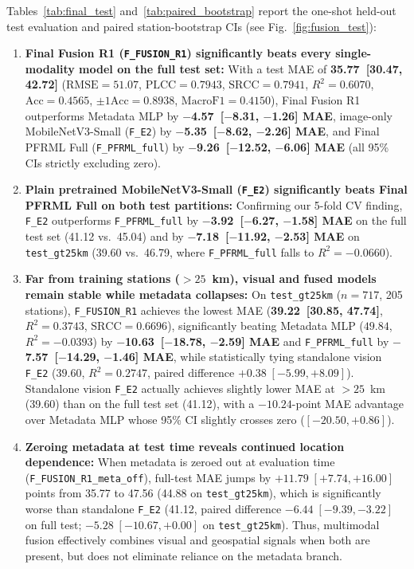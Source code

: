\documentclass[conference]{IEEEtran}
\begin{document}
Tables~\ref{tab:final_test} and~\ref{tab:paired_bootstrap} report the one-shot
held-out test evaluation and paired station-bootstrap CIs (see
Fig.~\ref{fig:fusion_test}):
\begin{enumerate}
  \item \textbf{Final Fusion R1 (\texttt{F\_FUSION\_R1}) significantly beats
        every single-modality model on the full test set:} With a test MAE of
        \textbf{35.77~[30.47, 42.72]} ($\text{RMSE} = 51.07$,
        $\text{PLCC} = 0.7943$, $\text{SRCC} = 0.7941$, $R^2 = 0.6070$,
        $\text{Acc} = 0.4565$, $\pm 1\text{Acc} = 0.8938$,
        $\text{MacroF1} = 0.4150$), Final Fusion R1 outperforms Metadata MLP by
        \textbf{$-$4.57~[$-$8.31, $-$1.26] MAE}, image-only MobileNetV3-Small
        (\texttt{F\_E2}) by \textbf{$-$5.35~[$-$8.62, $-$2.26] MAE}, and Final
        PFRML Full (\texttt{F\_PFRML\_full}) by \textbf{$-$9.26~[$-$12.52,
        $-$6.06] MAE} (all 95\% CIs strictly excluding zero).
  \item \textbf{Plain pretrained MobileNetV3-Small (\texttt{F\_E2})
        significantly beats Final PFRML Full on both test partitions:}
        Confirming our 5-fold CV finding, \texttt{F\_E2} outperforms
        \texttt{F\_PFRML\_full} by \textbf{$-$3.92~[$-$6.27, $-$1.58] MAE} on
        the full test set (41.12 vs.\ 45.04) and by \textbf{$-$7.18~[$-$11.92,
        $-$2.53] MAE} on \texttt{test\_gt25km} (39.60 vs.\ 46.79, where
        \texttt{F\_PFRML\_full} falls to $R^2 = -0.0660$).
  \item \textbf{Far from training stations ($> 25$~km), visual and fused models
        remain stable while metadata collapses:} On \texttt{test\_gt25km}
        ($n = 717$, 205 stations), \texttt{F\_FUSION\_R1} achieves the lowest
        MAE (\textbf{39.22~[30.85, 47.74]}, $R^2 = 0.3743$,
        $\text{SRCC} = 0.6696$), significantly beating Metadata MLP ($49.84$,
        $R^2 = -0.0393$) by \textbf{$-$10.63~[$-$18.78, $-$2.59] MAE} and
        \texttt{F\_PFRML\_full} by \textbf{$-$7.57~[$-$14.29, $-$1.46] MAE},
        while statistically tying standalone vision \texttt{F\_E2} ($39.60$,
        $R^2 = 0.2747$, paired difference $+0.38\;[-5.99, +8.09]$). Standalone
        vision \texttt{F\_E2} actually achieves slightly lower MAE at $> 25$~km
        (39.60) than on the full test set (41.12), with a $-10.24$-point MAE
        advantage over Metadata MLP whose 95\% CI slightly crosses zero
        ($[-20.50, +0.86]$).
  \item \textbf{Zeroing metadata at test time reveals continued location
        dependence:} When metadata is zeroed out at evaluation time
        (\texttt{F\_FUSION\_R1\_meta\_off}), full-test MAE jumps by
        $+11.79\;[+7.74, +16.00]$ points from 35.77 to 47.56 (44.88 on
        \texttt{test\_gt25km}), which is significantly worse than standalone
        \texttt{F\_E2} (41.12, paired difference $-6.44\;[-9.39, -3.22]$ on full
        test; $-5.28\;[-10.67, +0.00]$ on \texttt{test\_gt25km}). Thus,
        multimodal fusion effectively combines visual and geospatial signals
        when both are present, but does not eliminate reliance on the metadata
        branch.
\end{enumerate}
\end{document}
